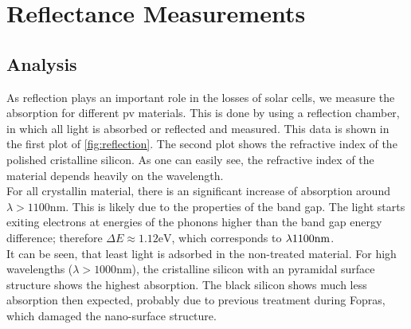\section{Reflectance Measurements}
\label{sec:Auswertung}

\subsection{Analysis}
As reflection plays an important role in the losses of solar cells, we measure the absorption for different pv materials. This is 
done by using a reflection chamber, in which all light is absorbed or reflected and measured. This data is shown in the first 
plot of \ref{fig:reflection}. The second plot shows the refractive index of the polished cristalline silicon. As 
one can easily see, the refractive index of the material depends heavily on the wavelength.\\ For all crystallin material, there is an 
significant increase of absorption around $\lambda > 1100 \si{\nano\meter}$. This is likely due to the properties of the band gap. 
The light starts exiting electrons at energies of the phonons higher than the band gap energy difference; 
therefore $\Delta E \approx 1.12 \si{\electronvolt}$, which corresponds to $\lambda \small 1100 \si{\nano\meter}$.\\
It can be seen, that least light is adsorbed in the non-treated material. For high wavelengths ($\lambda > 1000 \si{\nano\meter}$), 
the cristalline silicon with an pyramidal surface structure shows the highest absorption. The black silicon shows much less 
absorption then expected, probably due to previous treatment during Fopras, which damaged the nano-surface structure.

